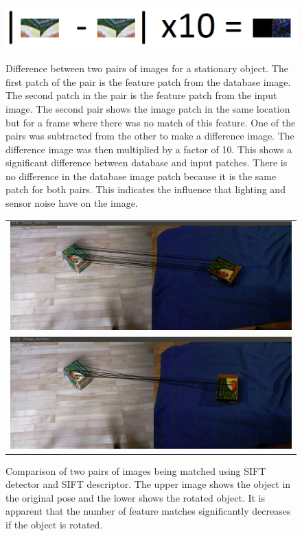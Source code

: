 \begin{figure}
\centering

{\includegraphics[width=1\columnwidth]{figures/patches.png}}

\caption{Difference between two pairs of images for a stationary object. The first patch of the pair is the feature patch from the database image. The second patch in the pair is the feature patch from the input image. The second pair shows the image patch in the same location but for a frame where there was no match of this feature.  One of the pairs was subtracted from the other to make a difference image.  The difference image was then multiplied by a factor of 10. This shows a significant difference between database and input patches. There is no difference in the database image patch because it is the same patch for both pairs.  This indicates the influence that lighting and sensor noise have on the image.}
\label{fig:patches}
\end{figure}

\begin{figure}
\centering
    \begin{tabular}{c}
 

\includegraphics[width=0.7\columnwidth]{figures/sift-gpu-no-rotation.png}\\
\includegraphics[width=0.7\columnwidth]{figures/siftgpu-rotation.png}\\
    \end{tabular}


\caption{Comparison of two pairs of images being matched using SIFT detector and SIFT descriptor. The upper image shows the object in the original pose and the lower shows the rotated object. It is apparent that the number of feature matches significantly decreases if the object is rotated. }
\label{fig:sift-features}
\end{figure}

